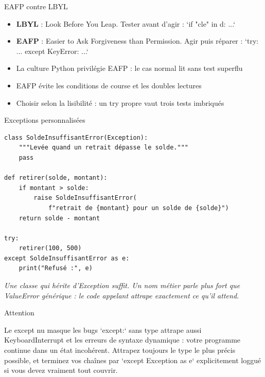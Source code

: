 \documentclass[aspectratio=169,11pt]{beamer}
\begin{document}
\begin{frame}{EAFP contre LBYL}
\begin{itemize}
  \item \textbf{LBYL} : Look Before You Leap. Tester avant d'agir : `if "cle" in d: ...`
  \item \textbf{EAFP} : Easier to Ask Forgiveness than Permission. Agir puis réparer : `try: ... except KeyError: ...`
  \item La culture Python privilégie EAFP : le cas normal lit sans test superflu
  \item EAFP évite les conditions de course et les doubles lectures
  \item Choisir selon la lisibilité : un try propre vaut trois tests imbriqués
\end{itemize}
\end{frame}

\begin{frame}[fragile]{Exceptions personnalisées}

\begin{lstlisting}[style=py]
class SoldeInsuffisantError(Exception):
    """Levée quand un retrait dépasse le solde."""
    pass

def retirer(solde, montant):
    if montant > solde:
        raise SoldeInsuffisantError(
            f"retrait de {montant} pour un solde de {solde}")
    return solde - montant

try:
    retirer(100, 500)
except SoldeInsuffisantError as e:
    print("Refusé :", e)
\end{lstlisting}
\vspace{0.5pt}

{\small\color{PyGris}\itshape Une classe qui hérite d'Exception suffit. Un nom métier parle plus fort que ValueError générique : le code appelant attrape exactement ce qu'il attend.}

\end{frame}

\begin{frame}{Attention}
\begin{alertblock}{Le except nu masque les bugs}
`except:` sans type attrape aussi KeyboardInterrupt et les erreurs de syntaxe dynamique : votre programme continue dans un état incohérent. Attrapez toujours le type le plus précis possible, et terminez vos chaînes par `except Exception as e` explicitement loggué si vous devez vraiment tout couvrir.
\end{alertblock}
\end{frame}
\end{document}
